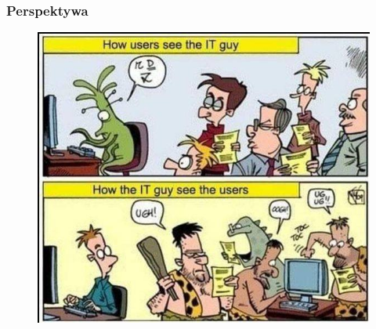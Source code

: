 \documentclass[10pt,t]{beamer}
\begin{document}
\begin{frame}
  \frametitle{Perspektywa}


  \begin{figure}

    \centering


    \includegraphics[scale=0.38]
    {./PresentationsPictures/IT-guys-and-users.jpg}

  \end{figure}

\end{frame}
\end{document}
